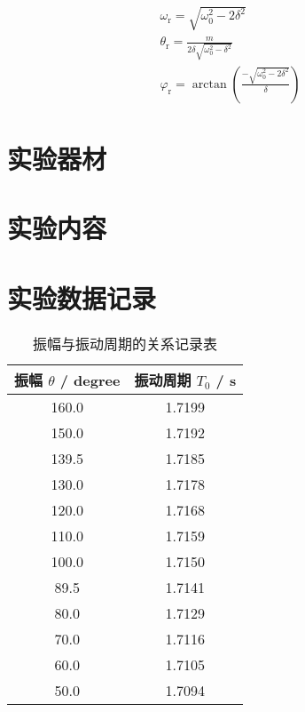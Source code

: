 \documentclass[12pt]{ctexart}
\begin{document}
    \begin{equation}
        \begin{gathered}
            \label{align:princ-2}
            \omega_\mathrm{r} = \sqrt{\omega_0^2 - 2\delta^2} \\
            \theta_\mathrm{r} = \frac{m}{2\delta\sqrt{\omega_0^2 - \delta^2}} \\
            \varphi_\mathrm{r} = \arctan \left( \frac{-\sqrt{\omega_0^2-2\delta^2}}{\delta} \right)
        \end{gathered}
    \end{equation}

    \section{实验器材}

    \section{实验内容}

    \section{实验数据记录}

    \begin{table}[hp]
        \centering
        \caption{振幅与振动周期的关系记录表}
        \label{table:theta-T0}
        \begin{tabular}{|c|c|}
            \hline
            振幅 $\theta$ / degree & 振动周期 $T_0$ / s \\ \hline
            160.0 & 1.7199 \\ \hline
            150.0 & 1.7192 \\ \hline
            139.5 & 1.7185 \\ \hline
            130.0 & 1.7178 \\ \hline
            120.0 & 1.7168 \\ \hline
            110.0 & 1.7159 \\ \hline
            100.0 & 1.7150 \\ \hline
            89.5 & 1.7141 \\ \hline
            80.0 & 1.7129 \\ \hline
            70.0 & 1.7116 \\ \hline
            60.0 & 1.7105 \\ \hline
            50.0 & 1.7094 \\ \hline
        \end{tabular}
    \end{table}
\end{document}
